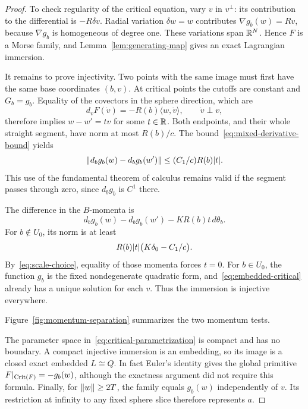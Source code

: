 \begin{proof}
To check regularity of the critical equation, vary $v$ in $v^\perp$: its contribution to the differential is $-R\delta v$. Radial variation $\delta w=w$ contributes $\nabla g_b(w)=Rv$, because $\nabla g_b$ is homogeneous of degree one. These variations span $\mathbb R^N$. Hence $F$ is a Morse family, and Lemma~\ref{lem:generating-map} gives an exact Lagrangian immersion.

It remains to prove injectivity. Two points with the same image must first have the same base coordinates $(b,v)$. At critical points the cutoffs are constant and $G_b=g_b$. Equality of the covectors in the sphere direction, which are
\[
 d_vF(\dot v)=-R(b)\langle w,\dot v\rangle,
 \qquad \dot v\perp v,
\]
therefore implies $w-w'=tv$ for some $t\in\mathbb R$. Both endpoints, and their whole straight segment, have norm at most $R(b)/c$. The bound~\eqref{eq:mixed-derivative-bound} yields
\begin{equation}\label{eq:collision-bound}
 \lVert d_bg_b(w)-d_bg_b(w')\rVert
 \leq (C_1/c)R(b)\lvert t\rvert.
\end{equation}
This use of the fundamental theorem of calculus remains valid if the segment passes through zero, since $d_bg_b$ is $C^1$ there.

The difference in the $B$-momenta is
\[
 d_bg_b(w)-d_bg_b(w')-KR(b)t\,d\theta_b.
\]
For $b\notin U_0$, its norm is at least
\[
 R(b)\lvert t\rvert\bigl(K\delta_0-C_1/c\bigr).
\]
By~\eqref{eq:scale-choice}, equality of those momenta forces $t=0$. For $b\in U_0$, the function $g_b$ is the fixed nondegenerate quadratic form, and~\eqref{eq:embedded-critical} already has a unique solution for each $v$. Thus the immersion is injective everywhere.

Figure~\ref{fig:momentum-separation} summarizes the two momentum tests.


The parameter space in~\eqref{eq:critical-parametrization} is compact and has no boundary. A compact injective immersion is an embedding, so its image is a closed exact embedded $L\cong Q$. In fact Euler's identity gives the global primitive $F|_{\operatorname{Crit}(F)}=-g_b(w)$, although the exactness argument did not require this formula. Finally, for $\lVert w\rVert\geq2T$, the family equals $g_b(w)$ independently of $v$. Its restriction at infinity to any fixed sphere slice therefore represents $a$.
\end{proof}
